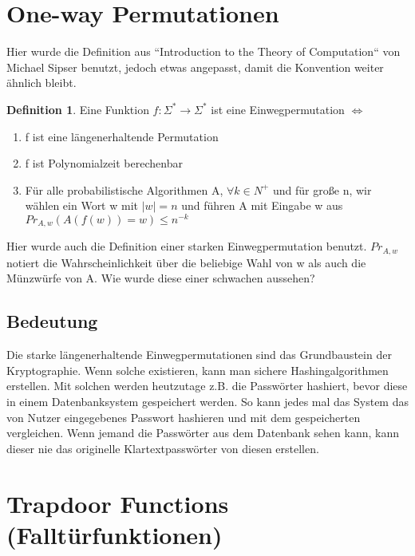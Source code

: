 \documentclass[12pt,a4paper]{article}
\theoremstyle{definition}
\newtheorem{definition}[theorem]{Definition}
\begin{document}
    \section{One-way Permutationen}

    Hier wurde die Definition aus ``Introduction to the Theory of Computation`` von Michael Sipser benutzt, jedoch
    etwas angepasst, damit die Konvention weiter ähnlich bleibt.

    \begin{definition}
        Eine Funktion $f: \Sigma^* \longrightarrow \Sigma^*$ ist eine Einwegpermutation $\Leftrightarrow$
        \begin{enumerate}
            \item f ist eine längenerhaltende Permutation
            \item f ist Polynomialzeit berechenbar
            \item Für alle probabilistische Algorithmen A, $\forall k \in N^+$ und für große n, wir wählen ein Wort w
            mit $|w| = n$ und führen A mit Eingabe w aus \\
            $Pr_{A, w}(A(f(w)) = w) \leq n^{-k}$
        \end{enumerate}
    \end{definition}

    Hier wurde auch die Definition einer starken Einwegpermutation benutzt. $Pr_{A, w}$ notiert die Wahrscheinlichkeit
    über die beliebige Wahl von w als auch die Münzwürfe von A.
    Wie wurde diese einer schwachen aussehen?

    \subsection{Bedeutung}
    Die starke längenerhaltende Einwegpermutationen sind das Grundbaustein der Kryptographie. Wenn solche existieren,
    kann man sichere Hashingalgorithmen erstellen. Mit solchen werden heutzutage z.B. die Passwörter hashiert, bevor
    diese in einem Datenbanksystem gespeichert werden. So kann jedes mal das System das von Nutzer eingegebenes Passwort
    hashieren und mit dem gespeicherten vergleichen. Wenn jemand die Passwörter aus dem Datenbank sehen kann, kann
    dieser nie das originelle Klartextpasswörter von diesen erstellen.

    \section{Trapdoor Functions (Falltürfunktionen)}
\end{document}
